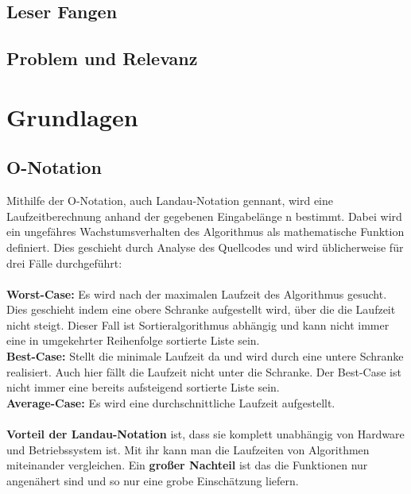 \documentclass{article}
\begin{document}
\subsection{Leser Fangen}
\subsection{Problem und Relevanz}

\section{Grundlagen}
\subsection{O-Notation}
Mithilfe der O-Notation, auch Landau-Notation gennant, wird eine Laufzeitberechnung anhand der gegebenen Eingabelänge n bestimmt. Dabei wird ein ungefähres Wachstumsverhalten des Algorithmus als mathematische Funktion definiert. Dies geschieht durch Analyse des Quellcodes und wird üblicherweise für drei Fälle durchgeführt: \cite{ONotation}\\ \\
\textbf {Worst-Case:} Es wird nach der maximalen Laufzeit des Algorithmus gesucht. Dies geschieht indem eine obere Schranke aufgestellt wird, über die die Laufzeit nicht steigt. Dieser Fall ist Sortieralgorithmus abhängig und kann nicht immer eine in umgekehrter Reihenfolge sortierte Liste sein.   \\
\textbf {Best-Case:} Stellt die minimale Laufzeit da und wird durch eine untere Schranke realisiert. Auch hier fällt die Laufzeit nicht unter die Schranke. Der Best-Case ist nicht immer eine bereits aufsteigend sortierte Liste sein.\\
\textbf {Average-Case:} Es wird eine durchschnittliche Laufzeit aufgestellt. \\ \\
\textbf{Vorteil der Landau-Notation} ist, dass sie komplett unabhängig von Hardware und Betriebssystem ist. Mit ihr kann man die Laufzeiten von Algorithmen miteinander vergleichen.
Ein \textbf{großer Nachteil} ist das die Funktionen nur angenähert sind und so nur eine grobe Einschätzung liefern.%
\end{document}

